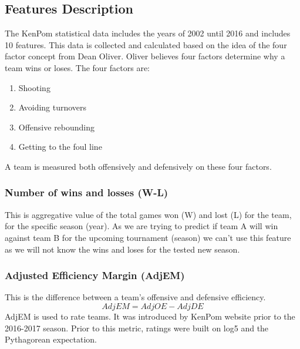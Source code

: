 \documentclass[
10pt, %
a4paper, %
oneside, %
headinclude,footinclude, %
BCOR5mm, %
]{scrartcl}
\begin{document}
\subsection{Features Description}
The KenPom statistical data includes the years of 2002 until 2016 and includes 10 features. This data is collected and calculated based on the idea of the four factor concept from Dean Oliver.
Oliver believes four factors determine why a team wins or loses. The four factors are:
\begin{enumerate}
\item Shooting
\item Avoiding turnovers
\item Offensive rebounding
\item Getting to the foul line
\end{enumerate}
A team is measured both offensively and defensively on these four factors.
\subsubsection{Number of wins and losses (W-L)}
This is aggregative value of the total games won (W) and lost (L) for the team, for the specific season (year). As we are trying to predict if team A will win against team B for the upcoming tournament (season) we can't use this feature as we will not know the wins and loses for the tested new season.
\subsubsection{Adjusted Efficiency Margin (AdjEM)}
This is the difference between a team’s offensive and defensive efficiency.
\[AdjEM = AdjOE - AdjDE\]
AdjEM is used to rate teams. It was introduced by KenPom website prior to the 2016-2017 season. Prior to this metric, ratings were built on log5 and the Pythagorean expectation.
\end{document}

